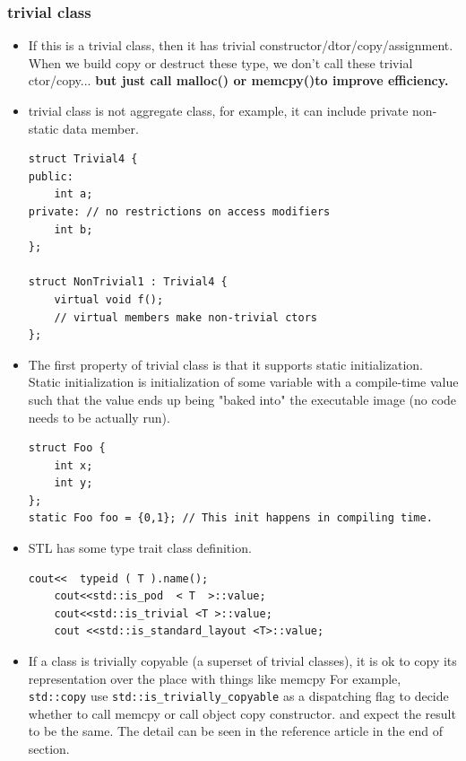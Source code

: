 \documentclass[a4paper,11pt,twoside]{book}
\begin{document}
\subsubsection{trivial class}
\begin{itemize}
	\item If this is a trivial class, then it has trivial constructor/dtor/copy/assignment. When we build copy or destruct these type, we don't call these trivial ctor/copy... \textbf{but just call malloc() or memcpy()to improve efficiency.} 
	
	\item trivial class is not aggregate class, for example, it can include private non-static data member. 
\begin{lstlisting}[numbers=none]
struct Trivial4 {
public:
	int a;
private: // no restrictions on access modifiers
	int b;
};
		
struct NonTrivial1 : Trivial4 {
	virtual void f(); 
	// virtual members make non-trivial ctors
};
\end{lstlisting}
	
	
	\item The first property of trivial class is that it supports static initialization. Static initialization is initialization of some variable with a compile-time value such that the value ends up being "baked into" the executable image (no code needs to be actually run).
\begin{lstlisting}[numbers=none]
struct Foo {
	int x;
	int y;
};
static Foo foo = {0,1}; // This init happens in compiling time.
\end{lstlisting}

\item STL has some type trait class definition. 
\begin{lstlisting}[numbers=none]
	cout<<  typeid ( T ).name();
	cout<<std::is_pod  < T  >::value;
	cout<<std::is_trivial <T >::value;
	cout <<std::is_standard_layout <T>::value;
\end{lstlisting}
	
	\item If a class is trivially copyable (a superset of trivial classes), it is ok to copy its representation over the place with things like memcpy For example, \texttt{std::copy} use \texttt{std::is\_trivially\_copyable} as a dispatching flag to decide whether to call memcpy or call object copy constructor. and expect the result to be the same. The detail can be seen in the reference article in the end of section. 
	

\end{itemize}
\end{document}
